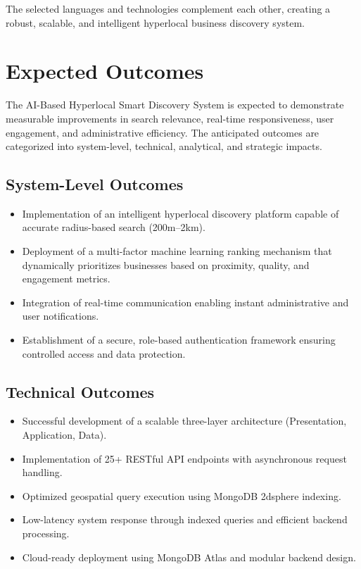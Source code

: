 \documentclass[12pt,a4paper]{report}
\begin{document}
The selected languages and technologies complement each other, creating a robust, scalable, and intelligent hyperlocal business discovery system.


\chapter{Expected Outcomes}

The AI-Based Hyperlocal Smart Discovery System is expected to demonstrate measurable improvements in search relevance, real-time responsiveness, user engagement, and administrative efficiency. The anticipated outcomes are categorized into system-level, technical, analytical, and strategic impacts.

\section{ System-Level Outcomes}

\begin{itemize}

\item Implementation of an intelligent hyperlocal discovery platform capable of accurate radius-based search (200m--2km).

\item Deployment of a multi-factor machine learning ranking mechanism that dynamically prioritizes businesses based on proximity, quality, and engagement metrics.

\item Integration of real-time communication enabling instant administrative and user notifications.

\item Establishment of a secure, role-based authentication framework ensuring controlled access and data protection.

\end{itemize}

\section{ Technical Outcomes}

\begin{itemize}

\item Successful development of a scalable three-layer architecture (Presentation, Application, Data).

\item Implementation of 25+ RESTful API endpoints with asynchronous request handling.

\item Optimized geospatial query execution using MongoDB 2dsphere indexing.

\item Low-latency system response through indexed queries and efficient backend processing.

\item Cloud-ready deployment using MongoDB Atlas and modular backend design.

\end{itemize}
\end{document}
